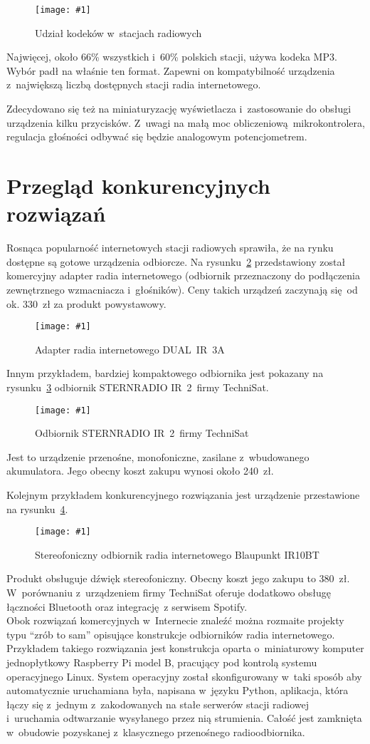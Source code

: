 \documentclass[polish]{aghengthesis}
\newcommand{\imgint}[4]{
	\begin{figure}[{#4}]
		\centering
		\texttt{[image: \#1]}
		\caption{#2}
		\label{#1}
	\end{figure}
}
\newcommand{\imgh}[3]{\imgint{#1}{#2}{#3}{H}}
\begin{document}
			\imgh{3/rb_chart_new}{Udział kodeków w~stacjach radiowych}{0.8}
			
			Najwięcej, około 66\% wszystkich i~60\% polskich stacji, używa kodeka MP3. Wybór padł na właśnie ten format.
			Zapewni on kompatybilność urządzenia z~największą liczbą dostępnych stacji radia internetowego.
			\pagebreak
			
			Zdecydowano się też na miniaturyzację wyświetlacza i~zastosowanie do obsługi urządzenia kilku przycisków. Z~uwagi na małą moc obliczeniową mikrokontrolera, regulacja głośności odbywać się będzie analogowym potencjometrem.
		
	\section{Przegląd konkurencyjnych rozwiązań}
		Rosnąca popularność internetowych stacji radiowych sprawiła, że na rynku dostępne są gotowe urządzenia odbiorcze.
		Na rysunku~\ref{1/radio_adapter} przedstawiony został komercyjny adapter radia internetowego (odbiornik przeznaczony do podłączenia zewnętrznego wzmacniacza i~głośników). Ceny takich urządzeń zaczynają się od ok. 330~zł za produkt powystawowy. 
		\imgh{1/radio_adapter}{Adapter radia internetowego DUAL~IR~3A\textsuperscript{\cite{radio_adapter}}}{0.7}
		
		Innym przykładem, bardziej kompaktowego odbiornika jest pokazany na rysunku~\ref{1/radio_tanie} odbiornik STERNRADIO IR~2~firmy TechniSat.
		\imgh{1/radio_tanie}{Odbiornik STERNRADIO IR~2~firmy TechniSat\textsuperscript{\cite{radio_tanie}}}{0.7}
		Jest to urządzenie przenośne, monofoniczne, zasilane z~wbudowanego akumulatora. Jego obecny koszt zakupu wynosi około 240~zł.
		
		\pagebreak
		Kolejnym przykładem konkurencyjnego rozwiązania jest urządzenie przestawione na rysunku~\ref{1/radio_drogie}.
		\imgh{1/radio_drogie}{Stereofoniczny odbiornik radia internetowego Blaupunkt IR10BT\textsuperscript{\cite{radio_drogie}}}{0.7}
		Produkt obsługuje dźwięk stereofoniczny. Obecny koszt jego zakupu to 380~zł. W~porównaniu z~urządzeniem firmy TechniSat oferuje dodatkowo obsługę łączności Bluetooth oraz integrację z serwisem Spotify.
		$ $\\
		
		Obok rozwiązań komercyjnych w~Internecie znaleźć można rozmaite projekty typu \enquote{zrób to sam} opisujące konstrukcje odbiorników radia internetowego. Przykładem takiego rozwiązania jest konstrukcja\textsuperscript{\cite{rpi_sbc_radio}} oparta o~miniaturowy komputer jednopłytkowy Raspberry Pi model B, pracujący pod kontrolą systemu operacyjnego Linux. System operacyjny został skonfigurowany w~taki sposób aby automatycznie uruchamiana była, napisana w~języku Python, aplikacja, która łączy się z~jednym z~zakodowanych na stałe serwerów stacji radiowej i~uruchamia odtwarzanie wysyłanego przez nią strumienia. Całość jest zamknięta w~obudowie pozyskanej z~klasycznego przenośnego radioodbiornika.
		$ $\\
		
\end{document}
